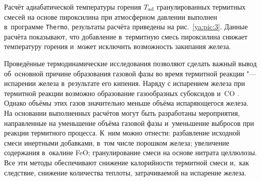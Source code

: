 
Расчёт адиабатической температуры  горения $T_{\rm ad}$ гранулированных термитных смесей   на основе пироксилина  при  атмосферном давлении  выполнен в~программе {\tt Thermo}, результаты расчёта приведены на рис.~\ref{ya:pic:3}.
Данные расчёта показывают, что добавление в~термитную смесь пироксилина снижает температуру горения и~может исключить возможность закипания железа.



\smallskip

Проведённые термодинамические исследования позволяют сделать важный вывод об~основной причине образования газовой фазы во время термитной реакции "--- испарении железа в~результате его кипения. 
Наряду с испарением железа при термитной реакции возможно образование газообразных субоксидов и~CO
\cite{yatc11:bib4}. 
Однако объёмы этих газов значительно меньше объёма испаряющегося железа. 
На основании выполненных расчётов могут быть разработаны мероприятия, направленные на уменьшение объёма газовой фазы и~уменьшение выбросов при реакции термитного процесса. 
К~ним можно отнести: разбавление исходной смеси инертными добавками, в~том числе порошком железа; увеличение содержания в~окалине FeO; гранулирование смеси на основе нитрата целлюлозы. 
Все эти методы обеспечивают снижение калорийности термитной смеси и,~как следствие, снижение количества теплоты, затрачиваемой на испарение железа.

